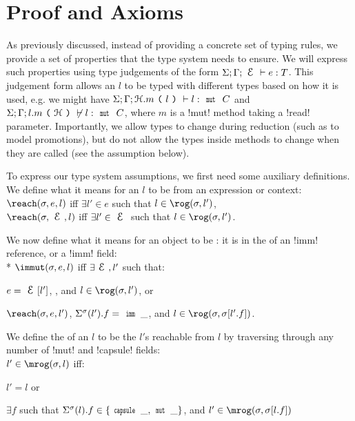 \section{Proof and Axioms}
\label{s:proof}

As previously discussed, instead of providing a concrete set of typing rules, we provide a set of properties that the type system needs to ensure.
We will express such properties using type judgements of the form $\ty{e}{T}$. This judgement form allows an $l$ to be typed with different types based on how it is used, e.g. we might have $\S;\G;\h.m\oR l \cR \vdash l : \Kw{mut}\ C$  and $\S;\G;l.m\oR \h \cR \nvdash l : \Kw{mut}\ C$, where $m$ is a \Q!mut! method taking a \Q!read! parameter. Importantly, we allow types to change during reduction (such as to model promotions), but do not allow the types inside methods to change when they are called (see the  assumption below).

To express our type system assumptions, we first need some auxiliary definitions. We define what it means for an $l$ to be \reach from an expression or context:\\
\indent $\reach(\s, e, l)$ iff $\exists l' \in e$ such that $l \in \rog(\s, l')$,\\
\indent $\reach(\s, \E, l)$ iff $\exists l' \in \E$ such that $l \in \rog(\s, l')$.

\noindent We now define what it means for an object to be \immut: it is in the \rog of an \Q!imm! reference, or a \reach \Q!imm! field:\\*
\indent $\immut(\s, e, l)$ iff $\exists \E, l'$ such that:
\begin{iitemize}
\item $e = \E[l']$, , and $l \in \rog(\s, l')$, or
\item $\reach(\s, e, l')$, $\Ss(l').f = \Kw{imm}\,\_$, and $l \in \rog(\s, \s[l'.f])$.
\end{iitemize}

\noindent We define the \mrog of an $l$ to be the $l'$s reachable from $l$ by traversing through any number of \Q!mut! and \Q!capsule! fields:\\
\indent $l' \in \mrog(\s, l)$ iff:%
\begin{iitemize}
	\item $l' = l$ or
	\item $\exists f$ such that $\Ss(l).f \in \{\Kw{capsule}\,\_, \Kw{mut}\,\_\}$, and $l' \in \mrog(\s, \s[l.f])$
\end{iitemize}


